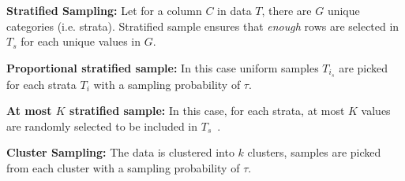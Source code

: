 \noindent \textbf{Stratified Sampling:}
Let for a column $C$ in data $T$, there are $G$ unique categories (i.e. strata). 
Stratified sample ensures that \textit{enough} rows are selected in $T_s$ for each unique values
in $G$. 
%


\noindent\textbf{Proportional stratified sample:} 
    In this case uniform samples $T_{i_{s}}$ are picked for each strata $T_{i}$ with a sampling probability of $\tau$.
    
    
\noindent\textbf{At most $K$ stratified sample:}
    In this case, for each strata, at most $K$ values are randomly selected to be included in $T_s$~\cite{agarwal2013blinkdb}.
    

\noindent \textbf{Cluster Sampling:}
The data is clustered into $k$  clusters,
samples are picked from each cluster with a sampling probability of $\tau$.



